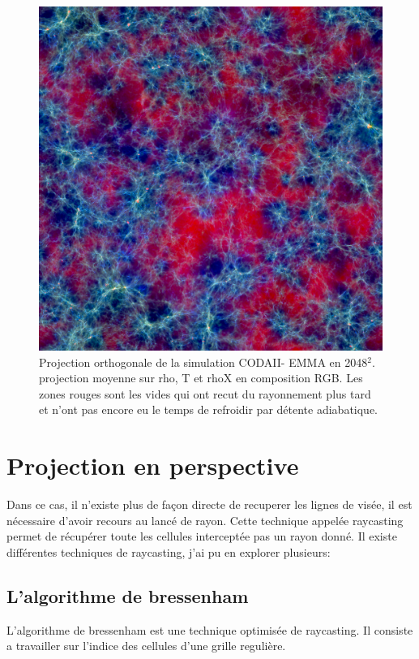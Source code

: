 \begin{figure}[bth]
        \includegraphics[width=.95\linewidth]{img/04/rgb-compose.jpeg} 
        \caption{Projection orthogonale de la simulation CODAII- EMMA en 2048$^2$.
        projection moyenne sur rho, T et rhoX en composition RGB.
Les zones rouges sont les vides qui ont recut du rayonnement plus tard et n'ont pas encore eu le temps de refroidir par détente adiabatique.  
        }
 		\label{fig:ortho}
\end{figure}

\section{Projection en perspective}

Dans ce cas, il n'existe plus de façon directe de recuperer les lignes de visée, il est nécessaire d'avoir recours au lancé de rayon.
Cette technique appelée raycasting permet de récupérer toute les cellules interceptée pas un rayon donné.
Il existe différentes techniques de raycasting, j'ai pu en explorer plusieurs:

\subsection{L'algorithme de bressenham}
L'algorithme de bressenham est une technique optimisée de raycasting.
Il consiste a travailler sur l'indice des cellules d'une grille regulière.

